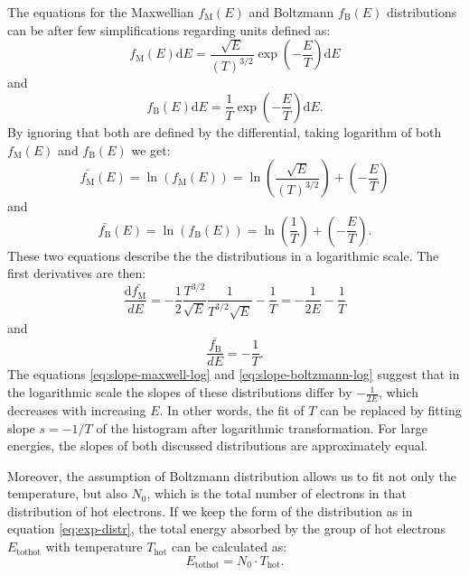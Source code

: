 The equations for the Maxwellian $f_\mathrm{M}(E)$ and Boltzmann $f_\mathrm{B}(E)$ distributions can be after few simplifications regarding units defined as:
\begin{equation}
	f_\mathrm{M}(E)\mathrm{d}E = \frac{\sqrt{E}}{(T)^{3/2}}\exp\left(-\frac{E}{T}\right)\mathrm{d}E
\end{equation}
and
\begin{equation}
	f_\mathrm{B}(E)\mathrm{d}E = \frac{1}{T}\exp\left(-\frac{E}{T}\right)\mathrm{d}E.
\end{equation}
By ignoring that both are defined by the differential, taking logarithm of both $f_\mathrm{M}(E)$ and $f_\mathrm{B}(E)$ we get:
\begin{equation}
	\bar{f_\mathrm{M}}(E) = \ln\left(f_\mathrm{M}(E)\right) = \ln\left(\frac{\sqrt{E}}{(T)^{3/2}}\right)+\left(-\frac{E}{T}\right)
\end{equation}
and
\begin{equation}
	\bar{f_\mathrm{B}}(E) = \ln\left(f_\mathrm{B}(E)\right) = \ln\left(\frac{1}{T}\right)+\left(-\frac{E}{T}\right).
\end{equation}
These two equations describe the the distributions in a logarithmic scale. The first derivatives are then:
\begin{equation}
	\label{eq:slope-maxwell-log}
	\frac{\mathrm{d}\bar{f_\mathrm{M}}}{dE} =-\frac{1}{2}\frac{T^{3/2}}{\sqrt{E}}\frac{1}{T^{3/2}\sqrt{E}}-\frac{1}{T} = -\frac{1}{2E}-\frac{1}{T}
\end{equation}
and
\begin{equation}
	\label{eq:slope-boltzmann-log}
	\frac{\bar{f_\mathrm{B}}}{dE} = -\frac{1}{T}.
\end{equation}
The equations \ref{eq:slope-maxwell-log} and \ref{eq:slope-boltzmann-log} suggest that in the logarithmic scale the slopes of these distributions differ by $-\frac{1}{2E}$, which decreases with increasing $E$. In other words, the fit of $T$ can be replaced by fitting slope $s = -1/T$ of the histogram after logarithmic transformation. For large energies, the slopes of both discussed distributions are approximately equal. 

Moreover, the assumption of Boltzmann distribution allows us to fit not only the temperature, but also $N_0$, which is the total number of electrons in that distribution of hot electrons. If we keep the form of the distribution as in equation \ref{eq:exp-distr}, the total energy absorbed by the group of hot electrons $E_{\mathrm{tothot}}$ with temperature $T_\mathrm{hot}$ can be calculated as:
\begin{equation}
	E_{\mathrm{tothot}} = N_0\cdot T_\mathrm{hot}.
\end{equation}


